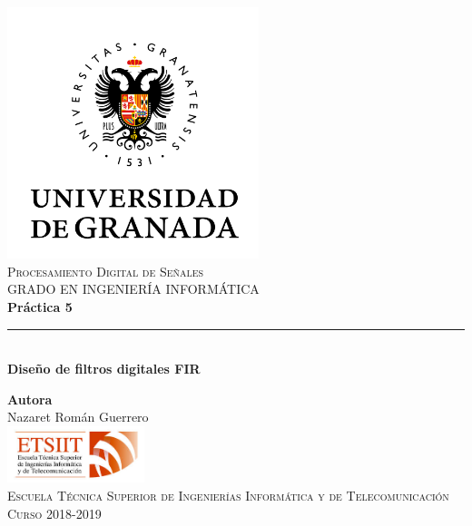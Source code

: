 \documentclass[11pt,a4paper]{article}
\begin{document}
\begin{titlepage}

\begin{minipage}{\textwidth}

\centering
\includegraphics[width=0.55\textwidth]{img/logo.png}\\

\textsc{\Large Procesamiento Digital de Señales\\[0.2cm]}
\textsc{GRADO EN INGENIERÍA INFORMÁTICA}\\[1cm]

{\Huge\bfseries Práctica 5\\}
\noindent\rule[-1ex]{\textwidth}{3pt}\\[3.5ex]
{\large\bfseries Diseño de filtros digitales FIR}
\end{minipage}

\vspace{1.5cm}
\begin{minipage}{\textwidth}
\centering

\textbf{Autora}\\ {Nazaret Román Guerrero}\\[2.5ex]
\includegraphics[width=0.3\textwidth]{img/etsiit.jpeg}\\[0.1cm]
\vspace{1cm}
\textsc{Escuela Técnica Superior de Ingenierías Informática y de Telecomunicación}\\
\vspace{1cm}
\textsc{Curso 2018-2019}
\end{minipage}
\end{titlepage}
\end{document}
